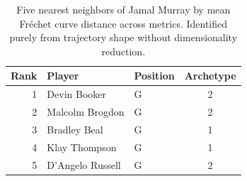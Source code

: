 \begin{table}[htbp]
  \centering\small
  \begin{tabular}{rllc}
    \toprule
    Rank & Player & Position & Archetype \\
    \midrule
    1 & Devin Booker & G & 2 \\
    2 & Malcolm Brogdon & G & 2 \\
    3 & Bradley Beal & G & 1 \\
    4 & Klay Thompson & G & 1 \\
    5 & D'Angelo Russell & G & 2 \\
    \bottomrule
  \end{tabular}
  \caption{Five nearest neighbors of Jamal Murray by mean Fr\'{e}chet curve distance across metrics. Identified purely from trajectory shape without dimensionality reduction.}
  \label{tab:Jamal_Murray_frechet_curve_neighbors}
\end{table}

